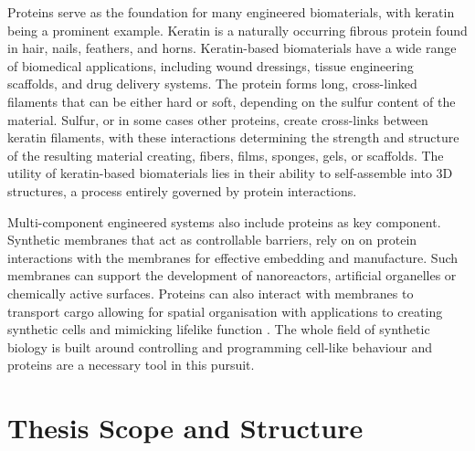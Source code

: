 Proteins serve as the foundation for many engineered biomaterials, with keratin being a prominent example. Keratin is a naturally occurring fibrous protein found in hair, nails, feathers, and horns.\cite{sharma_keratin_2019} Keratin-based biomaterials have a wide range of biomedical applications, including wound dressings, tissue engineering scaffolds, and drug delivery systems.\cite{feroz_keratin_2020} The protein forms long, cross-linked filaments that can be either hard or soft, depending on the sulfur content of the material. Sulfur, or in some cases other proteins, create cross-links between keratin filaments, with these interactions determining the strength and structure of the resulting material creating, fibers, films, sponges, gels, or scaffolds. The utility of keratin-based biomaterials lies in their ability to self-assemble into 3D structures, a process entirely governed by protein interactions.\cite{feroz_keratin_2020}

Multi-component engineered systems also include proteins as key component. Synthetic membranes that act as controllable barriers, rely on  on protein interactions with the membranes for effective embedding and manufacture. \cite{garni_bioporesmembrane_2017} Such membranes can support the development of nanoreactors, artificial organelles or chemically active surfaces. Proteins can also interact with membranes to transport cargo allowing for spatial organisation with applications to creating synthetic cells and mimicking lifelike function \cite{ramm_diffusiophoretic_2021}. The whole field of synthetic biology is built around controlling and programming cell-like behaviour and proteins are a necessary tool in this pursuit. \cite{cameron_brief_2014}


\section{Thesis Scope and Structure}

